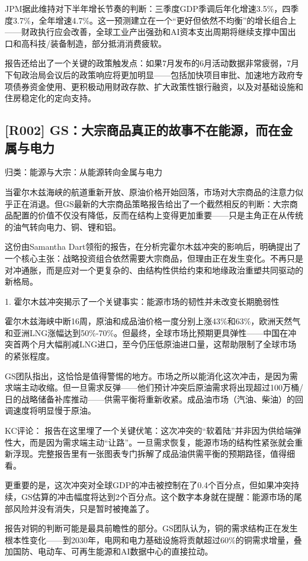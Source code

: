 \documentclass[11pt]{ctexart}
\begin{document}
JPM据此维持对下半年增长节奏的判断：三季度GDP季调后年化增速3.5\%，四季度3.7\%，全年增速4.7\%。这一预测建立在一个“更好但依然不均衡”的增长组合上——财政执行应会改善，全球工业产出强劲和AI资本支出周期将继续支撑中国出口和高科技/装备制造，部分抵消消费疲软。

报告还给出了一个关键的政策触发点：如果7月发布的6月活动数据非常疲弱，7月下旬政治局会议后的政策响应将更加明显——包括加快项目审批、加速地方政府专项债券资金使用、更积极动用财政存款、扩大政策性银行融资，以及对基础设施和住房稳定化的定向支持。

\subsection{[R002] GS：大宗商品真正的故事不在能源，而在金属与电力}
{\small\color{refgray}归类：能源与大宗：从能源转向金属与电力}

当霍尔木兹海峡的航道重新开放、原油价格开始回落，市场对大宗商品的注意力似乎正在消退。但GS最新的大宗商品策略报告给出了一个截然相反的判断：大宗商品配置的价值不仅没有降低，反而在结构上变得更加重要——只是主角正在从传统的油气转向电力、铜、锂和铝。

这份由Samantha Dart领衔的报告，在分析完霍尔木兹冲突的影响后，明确提出了一个核心主张：战略投资组合依然需要大宗商品，但理由正在发生变化。不再只是对冲通胀，而是应对一个更复杂的、由结构性供给约束和地缘政治重塑共同驱动的新格局。

1. 霍尔木兹冲突揭示了一个关键事实：能源市场的韧性并未改变长期脆弱性

霍尔木兹海峡中断16周，原油和成品油价格一度分别上涨43\%和63\%，欧洲天然气和亚洲LNG涨幅达到50\%-70\%。但最终，全球市场比预期更具弹性——中国在冲突首两个月大幅削减LNG进口，至今仍压低原油进口量，这帮助限制了全球市场的紧张程度。

GS团队指出，这恰恰是值得警惕的地方。市场之所以能消化这次冲击，是因为需求端主动收缩。但一旦需求反弹——他们预计冲突后原油需求将出现超过100万桶/日的战略储备补库推动——供需平衡将重新收紧。成品油市场（汽油、柴油）的回调速度将明显慢于原油。

KC评论： 报告在这里埋了一个关键伏笔：这次冲突的“软着陆”并非因为供给端弹性大，而是因为需求端主动“让路”。一旦需求恢复，能源市场的结构性紧张就会重新浮现。完整报告里有一张图表专门拆解了成品油供需平衡的预期路径，值得细看。

更重要的是，这次冲突对全球GDP的冲击被控制在了0.4个百分点，但如果冲突持续，GS估算的冲击幅度将达到2个百分点。这个数字本身就在提醒：能源市场的尾部风险并没有消失，只是暂时被掩盖了。

报告对铜的判断可能是最具前瞻性的部分。GS团队认为，铜的需求结构正在发生根本性变化——到2030年，电网和电力基础设施将贡献超过60\%的铜需求增量，叠加国防、电动车、可再生能源和AI数据中心的直接拉动。
\end{document}
